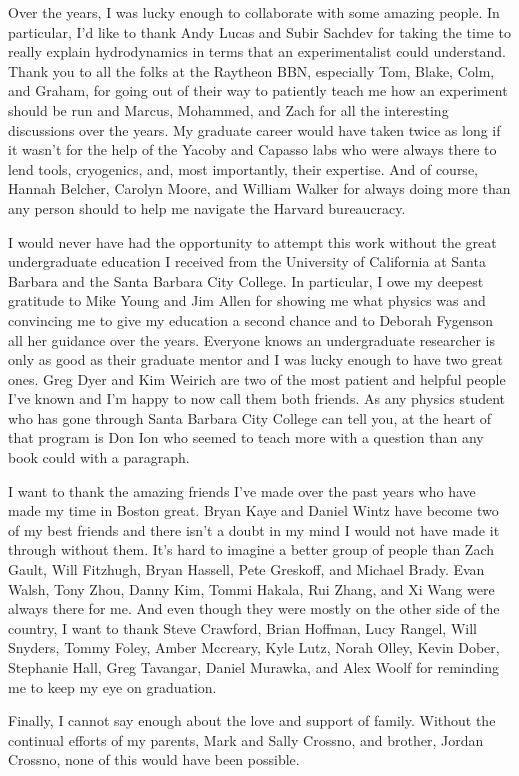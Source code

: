 Over the years, I was lucky enough to collaborate with some amazing people. In particular, I'd like to thank Andy Lucas and Subir Sachdev for taking the time to really explain hydrodynamics in terms that an experimentalist could understand. Thank you to all the folks at the Raytheon BBN, especially Tom, Blake, Colm, and Graham, for going out of their way to patiently teach me how an experiment should be run and Marcus, Mohammed, and Zach for all the interesting discussions over the years. My graduate career would have taken twice as long if it wasn't for the help of the Yacoby and Capasso labs who were always there to lend tools, cryogenics, and, most importantly, their expertise. And of course, Hannah Belcher, Carolyn Moore, and William Walker for always doing more than any person should to help me navigate the Harvard bureaucracy.

I would never have had the opportunity to attempt this work without the great undergraduate education I received from the University of California at Santa Barbara and the Santa Barbara City College. In particular, I owe my deepest gratitude to Mike Young and Jim Allen for showing me what physics was and convincing me to give my education a second chance and to Deborah Fygenson all her guidance over the years. Everyone knows an undergraduate researcher is only as good as their graduate mentor and I was lucky enough to have two great ones. Greg Dyer and Kim Weirich are two of the most patient and helpful people I've known and I'm happy to now call them both friends. As any physics student who has gone through Santa Barbara City College can tell you, at the heart of that program is Don Ion who seemed to teach more with a question than any book could with a paragraph.

I want to thank the amazing friends I've made over the past years who have made my time in Boston great. Bryan Kaye and Daniel Wintz have become two of my best friends and there isn't a doubt in my mind I would not have made it through without them. It's hard to imagine a better group of people than Zach Gault, Will Fitzhugh, Bryan Hassell, Pete Greskoff, and Michael Brady. Evan Walsh, Tony Zhou, Danny Kim, Tommi Hakala, Rui Zhang, and Xi Wang were always there for me. And even though they were mostly on the other side of the country, I want to thank Steve Crawford, Brian Hoffman, Lucy Rangel, Will Snyders, Tommy Foley, Amber Mccreary, Kyle Lutz, Norah Olley, Kevin Dober, Stephanie Hall, Greg Tavangar, Daniel Murawka, and Alex Woolf for reminding me to keep my eye on graduation. 

Finally, I cannot say enough about the love and support of family. Without the continual efforts of my parents, Mark and Sally Crossno, and brother, Jordan Crossno, none of this would have been possible. 